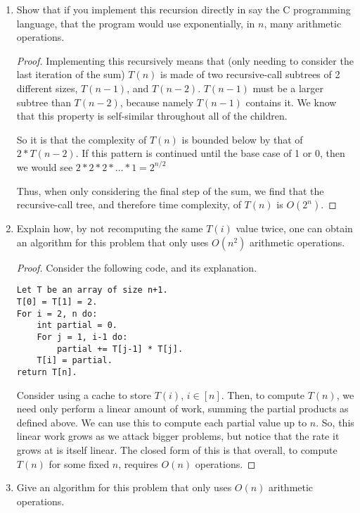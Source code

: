 \documentclass{article}
\begin{document}
	\begin{enumerate}[label=(\alph*)]
		\item Show that if you implement this recursion directly in say the C programming language, that the
		program would use exponentially, in $n$, many arithmetic operations.

		
		\begin{proof}
			Implementing this recursively means that (only needing to consider the last iteration of the sum) $T(n)$ is made of two recursive-call subtrees of 2 different sizes, $T(n-1)$, and $T(n-2)$.
			$T(n-1)$ must be a larger subtree than $T(n-2)$, because namely $T(n-1)$ contains it.
			We know that this property is self-similar throughout all of the children.

			So it is that the complexity of $T(n)$ is bounded below by that of $2*T(n-2)$.
			If this pattern is continued until the base case of 1 or 0, then we would see $2*2*2*\dots*1 = 2^{n/2}$
			
			Thus, when only considering the final step of the sum, we find that the recursive-call tree, and therefore time complexity, of $T(n)$ is $O(2^n)$.
		\end{proof}
	
		\item Explain how, by not recomputing the same $T(i)$ value twice, one can obtain an algorithm for this
		problem that only uses $O(n^2)$ arithmetic operations.
		
		\begin{proof}
			Consider the following code, and its explanation.
			\begin{lstlisting}
Let T be an array of size n+1.
T[0] = T[1] = 2.
For i = 2, n do:
	int partial = 0.
	For j = 1, i-1 do:
		partial += T[j-1] * T[j].
	T[i] = partial.
return T[n].
			\end{lstlisting}
			Consider using a cache to store $T(i)$, $i\in [n]$.
			Then, to compute $T(n)$, we need only perform a linear amount of work, summing the partial products as defined above.
			We can use this to compute each partial value up to $n$.
			So, this linear work grows as we attack bigger problems, but notice that the rate it grows at is itself linear.
			The closed form of this is that overall, to compute $T(n)$ for some fixed $n$, requires $O(n)$ operations.
		\end{proof}
		
		\item Give an algorithm for this problem that only uses $O(n)$ arithmetic operations.
	\end{enumerate}
	
	
\end{document}
